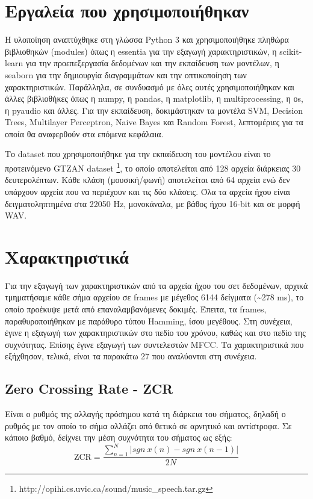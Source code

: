 \section{Εργαλεία που χρησιμοποιήθηκαν}

Η υλοποίηση αναπτύχθηκε στη γλώσσα Python 3 και χρησιμοποιήθηκε πληθώρα βιβλιοθηκών (modules) όπως η essentia για την εξαγωγή χαρακτηριστικών, η scikit-learn για την προεπεξεργασία δεδομένων και την εκπαίδευση των μοντέλων, η seaborn για την δημιουργία διαγραμμάτων και την οπτικοποίηση των χαρακτηριστικών. Παράλληλα, σε συνδυασμό με όλες αυτές χρησιμοποιήθηκαν και άλλες βιβλιοθήκες όπως η numpy, η pandas, η matplotlib, η multiprocessing, η οs, η pyaudio και άλλες. Για την εκπαίδευση, δοκιμάστηκαν τα μοντέλα SVM, Decision Trees, Multilayer Perceptron, Naive Bayes και Random Forest, λεπτομέριες για τα οποία θα αναφερθούν στα επόμενα κεφάλαια.

Το dataset που χρησιμοποιήθηκε για την εκπαίδευση του μοντέλου είναι το προτεινόμενο GTZAN dataset \footnote{http://opihi.cs.uvic.ca/sound/music\_speech.tar.gz}, το οποίο αποτελείται από 128 αρχεία διάρκειας 30 δευτερολέπτων. Κάθε κλάση (μουσική/φωνή) αποτελείται από 64 αρχεία ενώ δεν υπάρχουν αρχεία που να περιέχουν και τις δύο κλάσεις. Όλα τα αρχεία ήχου είναι δειγματοληπτημένα στα 22050 Hz, μονοκάναλα, με βάθος ήχου 16-bit και σε μορφή WAV.

\section{Χαρακτηριστικά}

Για την εξαγωγή των χαρακτηριστικών από τα αρχεία ήχου του σετ δεδομένων, αρχικά τμηματήσαμε κάθε σήμα αρχείου σε frames με μέγεθος 6144 δείγματα (\textasciitilde278 ms), το οποίο προέκυψε μετά από επαναλαμβανόμενες δοκιμές. Έπειτα, τα frames, παραθυροποιήθηκαν με παράθυρο τύπου Hamming, ίσου μεγέθους. Στη συνέχεια, έγινε η εξαγωγή των χαρακτηριστικών στο πεδίο του χρόνου, καθώς και στο πεδίο της συχνότητας. Επίσης έγινε εξαγωγή των συντελεστών MFCC. Τα χαρακτηριστικά που εξήχθησαν, τελικά, είναι τα παρακάτω 27 που αναλύονται στη συνέχεια.

\subsection{Zero Crossing Rate - ZCR}

Είναι ο ρυθμός της αλλαγής πρόσημου κατά τη διάρκεια του σήματος, δηλαδή ο ρυθμός με τον οποίο το σήμα αλλάζει από θετικό σε αρνητικό και αντίστροφα. Σε κάποιο βαθμό, δείχνει την μέση συχνότητα του σήματος ως εξής:
\begin{equation}
\text{ZCR} = \frac{\sum_{n=1}^{N} |sgn ~x(n) - sgn~x(n-1)|}{2N}
\end{equation}

